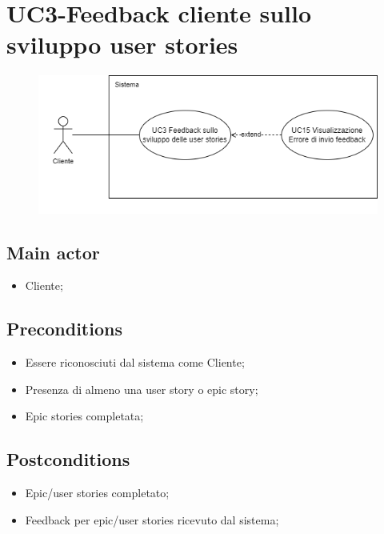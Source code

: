 \documentclass{article}
\begin{document}
\section{UC3-Feedback cliente sullo sviluppo user stories}
    \begin{figure}[h]
      \centering
      \includegraphics{./imgUML/UC3.png}
      \label{fig:immagine}
    \end{figure}
    
    \subsection*{Main actor}
    \begin{itemize}
        \item Cliente;
    \end{itemize}
    
    \subsection*{Preconditions}
    \begin{itemize}
        \item Essere riconosciuti dal sistema come Cliente;
        \item Presenza di almeno una user story o epic story;
        \item Epic stories completata;
    \end{itemize}
    
    \subsection*{Postconditions}
    \begin{itemize}
        \item Epic/user stories completato;
        \item Feedback per epic/user stories ricevuto dal sistema; 
    \end{itemize}
    
\end{document}
